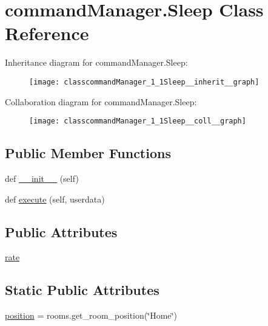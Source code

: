 \hypertarget{classcommandManager_1_1Sleep}{}\section{command\+Manager.\+Sleep Class Reference}
\label{classcommandManager_1_1Sleep}


Inheritance diagram for command\+Manager.\+Sleep\+:\nopagebreak
\begin{figure}[H]
\begin{center}
\leavevmode
\texttt{[image: classcommandManager\_1\_1Sleep\_\_inherit\_\_graph]}
\end{center}
\end{figure}


Collaboration diagram for command\+Manager.\+Sleep\+:\nopagebreak
\begin{figure}[H]
\begin{center}
\leavevmode
\texttt{[image: classcommandManager\_1\_1Sleep\_\_coll\_\_graph]}
\end{center}
\end{figure}
\subsection*{Public Member Functions}
\begin{DoxyCompactItemize}
\item 
def \hyperlink{classcommandManager_1_1Sleep_aa31bb1cc360e9bb1d723eaf953295268}{\+\_\+\+\_\+init\+\_\+\+\_\+} (self)
\item 
def \hyperlink{classcommandManager_1_1Sleep_a01a1b33499ec3c862bed42a6258b0f12}{execute} (self, userdata)
\end{DoxyCompactItemize}
\subsection*{Public Attributes}
\begin{DoxyCompactItemize}
\item 
\hyperlink{classcommandManager_1_1Sleep_ad1bca2bd2c57109d92089b82fafe23c1}{rate}
\end{DoxyCompactItemize}
\subsection*{Static Public Attributes}
\begin{DoxyCompactItemize}
\item 
\hyperlink{classcommandManager_1_1Sleep_ab64714b4c7c4b5a8824986a8e7af976e}{position} = rooms.\+get\+\_\+room\+\_\+position(\char`\"{}Home\char`\"{})
\end{DoxyCompactItemize}


